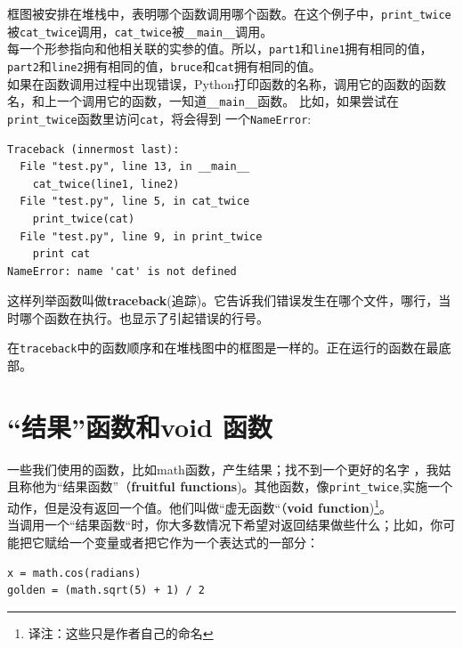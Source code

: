 框图被安排在堆栈中，表明哪个函数调用哪个函数。在这个例子中，\verb"print_twice"被\verb"cat_twice"调用，\verb"cat_twice"被\verb"__main__"调用。 \\

每一个形参指向和他相关联的实参的值。所以，{\tt part1}和{\tt line1}拥有相同的值，{\tt part2}和{\tt line2}拥有相同的值，{\tt bruce}和{\tt cat}拥有相同的值。\\

如果在函数调用过程中出现错误，Python打印函数的名称，调用它的函数的函数名，和上一个调用它的函数，一知道\verb"__main__"函数。
比如，如果尝试在\verb"print_twice"函数里访问{\tt cat}，将会得到
一个{\tt NameError}:

\beforeverb
\begin{verbatim}
Traceback (innermost last):
  File "test.py", line 13, in __main__
    cat_twice(line1, line2)
  File "test.py", line 5, in cat_twice
    print_twice(cat)
  File "test.py", line 9, in print_twice
    print cat
NameError: name 'cat' is not defined
\end{verbatim}
\afterverb

这样列举函数叫做{\bf traceback}(追踪)。它告诉我们错误发生在哪个文件，哪行，当时哪个函数在执行。也显示了引起错误的行号。


在{\tt traceback}中的函数顺序和在堆栈图中的框图是一样的。正在运行的函数在最底部。

\section{“结果”函数和void 函数}


一些我们使用的函数，比如math函数，产生结果；找不到一个更好的名字
，我姑且称他为“结果函数”（{\bf fruitful functions})。其他函数，像\verb"print_twice",实施一个动作，但是没有返回一个值。他们叫做“虚无函数“（{\bf void function})\footnote{译注：这些只是作者自己的命名}。  \\

当调用一个“结果函数“时，你大多数情况下希望对返回结果做些什么；比如，你可能把它赋给一个变量或者把它作为一个表达式的一部分：

\beforeverb
\begin{verbatim}
x = math.cos(radians)
golden = (math.sqrt(5) + 1) / 2
\end{verbatim}
\afterverb

